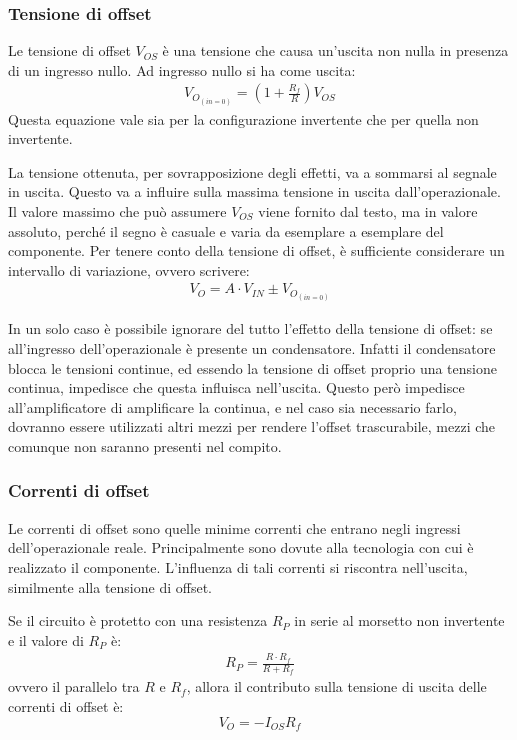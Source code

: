 \documentclass[a4paper,twocolumn,notitlepage]{book}
\begin{document}
	\subsubsection*{Tensione di offset}
	Le tensione di offset $V_{OS}$ è una tensione che causa un'uscita non nulla in presenza di un ingresso nullo. 
	Ad ingresso nullo si ha come uscita:
	\begin{align*}
		V_{O_{(in=0)}}= \left ( 1+\frac{R_f}{R} \right ) V_{OS}
	\end{align*}
	Questa equazione vale sia per la configurazione invertente che per quella non invertente.
	
	La tensione ottenuta, per sovrapposizione degli effetti, va a sommarsi al segnale in uscita. Questo va a influire sulla massima tensione in uscita dall'operazionale. 
	Il valore massimo che può assumere $V_{OS}$ viene fornito dal testo, ma in valore assoluto, perché il segno è casuale e varia da esemplare a esemplare del componente.
	Per tenere conto della tensione di offset, è sufficiente considerare un intervallo di variazione, ovvero scrivere:
	\begin{align*}
		V_O= A \cdot V_{IN} \pm V_{O_{(in=0)}} 
	\end{align*}
	
	In un solo caso è possibile ignorare del tutto l'effetto della tensione di offset: se all'ingresso dell'operazionale è presente un condensatore. Infatti il condensatore blocca le tensioni continue, ed essendo la tensione di offset proprio una tensione continua, impedisce che questa influisca nell'uscita. Questo però impedisce all'amplificatore di amplificare la continua, e nel caso sia necessario farlo, dovranno essere utilizzati altri mezzi per rendere l'offset trascurabile, mezzi che comunque non saranno presenti nel compito.
	
	\subsubsection*{Correnti di offset}
	Le correnti di offset sono quelle minime correnti che entrano negli ingressi dell'operazionale reale. Principalmente sono dovute alla tecnologia con cui è realizzato il componente. L'influenza di tali correnti si riscontra nell'uscita, similmente alla tensione di offset.
	
	Se il circuito è protetto con una resistenza $R_P$ in serie al morsetto non invertente e il valore di $R_P$ è:
	\begin{align*}
		R_P=\frac{R \cdot R_f}{R + R_f}
	\end{align*}
	ovvero il parallelo tra $R$ e $R_f$, allora il contributo sulla tensione di uscita delle correnti di offset è:
	\begin{equation}
		V_O=-I_{OS}R_f
	\end{equation}
	
\end{document}
